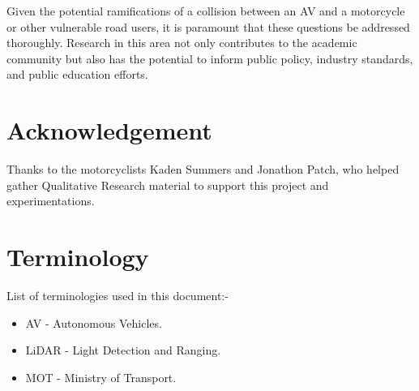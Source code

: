 \documentclass[conference]{IEEEtran}
\begin{document}
	Given the potential ramifications of a collision between an AV and a motorcycle or other vulnerable road users, it is paramount that these questions be addressed thoroughly. Research in this area not only contributes to the academic community but also has the potential to inform public policy, industry standards, and public education efforts.

\section{Acknowledgement}
    Thanks to the motorcyclists Kaden Summers and Jonathon Patch, who helped gather Qualitative Research material to support this project and experimentations. 

\section{Terminology}
	List of terminologies used in this document:-
	\begin{itemize}
		\item AV - Autonomous Vehicles.
		\item LiDAR - Light Detection and Ranging.
		\item MOT - Ministry of Transport.
	\end{itemize}
	

\nocite{*}
\renewcommand\refname{\section{Reference List}}
\small{
	}
\end{document}

